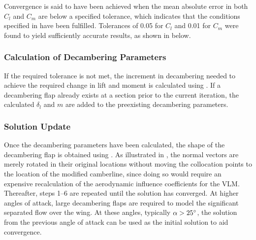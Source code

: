 Convergence is said to have been achieved when the mean absolute error in both $C_l$ and $C_m$ are below a specified tolerance, which indicates that the conditions specified in  have been fulfilled.
Tolerances of 0.05 for $C_l$ and 0.01 for $C_m$ were found to yield sufficiently accurate results, as shown in  below.

\subsubsection{Calculation of Decambering Parameters}\label{step:calc-decam}
If the required tolerance is not met, the increment in decambering needed to achieve the required change in lift and moment is calculated using . If a decambering flap already exists at a section prior to the current iteration, the calculated $\delta_l$ and $m$ are added to the preexisting decambering parameters.

\subsubsection{Solution Update}\label{step:sol-update}
Once the decambering parameters have been calculated, the shape of the decambering flap is obtained using .
%
%
%
%
As illustrated in , the normal vectors are merely rotated in their original locations without moving the collocation points to the location of the modified camberline, since doing so would require an expensive recalculation of the aerodynamic influence coefficients for the VLM.
Thereafter, steps 1--6 are repeated until the solution has converged. At higher angles of attack, large decambering flaps are required to model the significant separated flow over the wing. At these angles, typically $\alpha > 25^\circ{}$, the solution from the previous angle of attack can be used as the initial solution to aid convergence.

